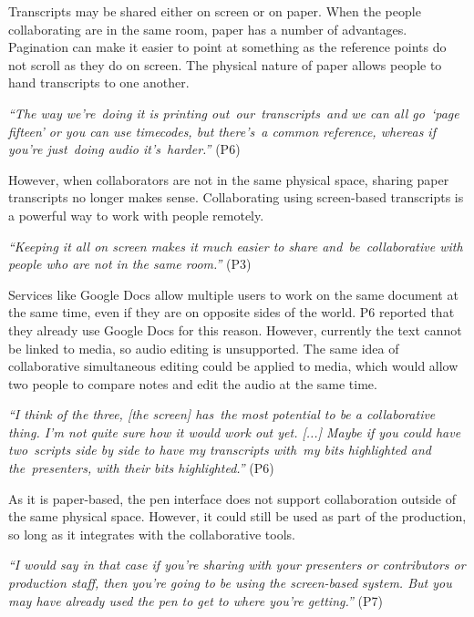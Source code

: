 
Transcripts may be shared either on screen or on paper. When the people collaborating are in the same room, paper has a
number of advantages. Pagination can make it easier to point at something as the reference points do not scroll as they
do on screen. The physical nature of paper allows people to hand transcripts to one another.

\textit{``The way we're doing it is printing out our transcripts and we can all go `page fifteen' or you can
use timecodes, but there's a common reference, whereas if you're just doing audio it's harder.''} (P6)

However, when collaborators are not in the same physical space, sharing paper transcripts no longer makes sense.
Collaborating using screen-based transcripts is a powerful way to work with people remotely.

\textit{``Keeping it all on screen makes it much easier to share and be collaborative with people who are not in the
same room.''} (P3)

Services like Google Docs allow multiple users to work on the same document at the same time, even if they are on
opposite sides of the world. P6 reported that they already use Google Docs for this reason. However, currently the text
cannot be linked to media, so audio editing is unsupported. The same idea of collaborative simultaneous editing could
be applied to media, which would allow two people to compare notes and edit the audio at the same time.

\textit{``I think of the three, [the screen] has the most potential to be a collaborative thing. I'm not quite sure how
  it would work out yet. [...]
  Maybe if you could have two scripts side by side to have my transcripts with my bits highlighted and the presenters,
  with their bits highlighted.''} (P6)

As it is paper-based, the pen interface does not support collaboration outside of the same physical space. However,
it could still be used as part of the production, so long as it integrates with the collaborative tools.

\textit{``I would say in that case if you're sharing with your presenters or contributors or production staff, then
  you're going to be using the screen-based system. But you may have already used the pen to get to where you're
  getting.''} (P7)


